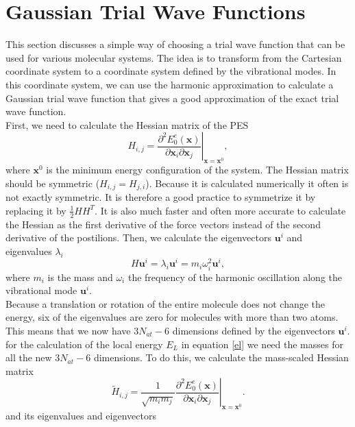 \documentclass [12pt]{report}
\begin{document}
\section{Gaussian Trial Wave Functions}
This section discusses a simple way of choosing a trial wave function that can be used for various molecular systems. The idea is to transform from the Cartesian coordinate system  to a coordinate system defined by the vibrational modes. In this coordinate system, we can use the harmonic approximation to calculate a Gaussian trial wave function that gives a good approximation of the exact trial wave function.\\
First, we need to calculate the Hessian matrix of the PES
\begin{equation}
H_{i,j} = \left. \frac{\partial^2 E_0^e(\bm{x})}{\partial \bm{x}_i \partial \bm{x}_j }\right|_{\bm{x} = \bm{x}^0},
\end{equation}
where $\bm{x}^0$ is the minimum energy configuration of the system. The Hessian matrix should be symmetric ($H_{i,j} = H_{j,i}$). Because it is calculated numerically it often is not exactly symmetric. It is therefore a good practice to symmetrize it by replacing it by $\frac{1}{2} H H^T$. It is also much faster and often more accurate to calculate the Hessian as the first derivative of the force vectors instead of the second derivative of the postilions. 
Then, we calculate the eigenvectors $\bm{u}^i$ and  eigenvalues $\lambda_i$
\begin{equation} \label{eigs}
H \bm{u}^i = \lambda_i \bm{u}^i = m_i \omega_i^2 \bm{u}^i,
\end{equation}
where $m_i$ is the mass and $\omega_i$ the frequency of the harmonic oscillation along the vibrational mode $\bm{u}^i$.\\
Because a translation or rotation of the entire molecule does not change the energy, six of the eigenvalues are zero for molecules with more than two atoms. This means that we now have $3 N_{at} - 6$ dimensions defined by the eigenvectors $\bm{u}^i$.\\
for the calculation of the local energy $E_L$ in equation \eqref{el} we need the masses for all the new $3 N_{at} - 6$ dimensions. To do this, we calculate the mass-scaled Hessian matrix
\begin{equation}
\tilde{H}_{i,j} = \left. \frac{1}{\sqrt{m_i m_j}}\frac{\partial^2 E_0^e(\bm{x})}{ \partial \bm{x}_i \partial \bm{x}_j }\right|_{\bm{x} = \bm{x}^0}.
\end{equation}
and its eigenvalues and eigenvectors
\end{document}
